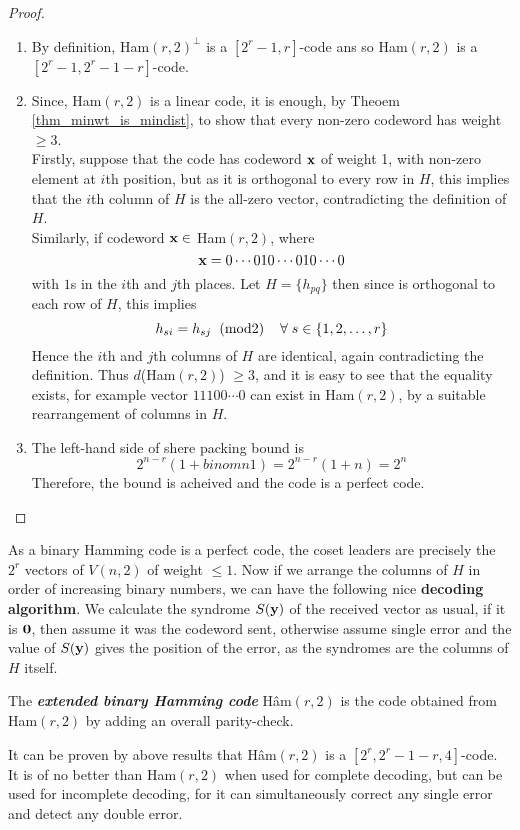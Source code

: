 \documentclass[../main.tex]{subfiles}
\begin{document}
\begin{proof}
	$\;$ 
	\begin{enumerate}[label=(\roman*)]
	\itemsep-1mm
		\item By definition, Ham$(r,2)^\perp$ is a $[2^r-1,r]$-code ans so Ham$(r,2	)$ is a $[2^r-1, 2^r-1-r]$-code.
		\item Since, Ham$(r,2)$ is a linear code, it is enough, by Theoem \ref{thm_minwt_is_mindist}, to show that every non-zero codeword has weight$\geq 3$.\\
		Firstly, suppose that the code has codeword $\textbf{x}$ of weight 1, with non-zero element at $i$th position, but as it is orthogonal to every row in $H$, this implies that the $i$th column of $H$ is the all-zero vector, contradicting the definition of $H$.\\
		Similarly, if codeword $\textbf{x} \in$ Ham$(r,2)$, where 
		\[
			\textbf{x} = 0\cdots 010\cdots 010\cdots 0
		\]
		with $1$s in the $i$th and $j$th places. Let $H = \{h_{pq}\}$ then since  is orthogonal to each row of $H$, this implies
		\[
			h_{si} = h_{sj} \hspace{2mm}(\text{mod} 2)\hspace{4mm} \forall\; s \in \{1,2,\ldots,r\}
		\]  
		 Hence the $i$th and $j$th columns of $H$ are identical, again contradicting the definition.
		 Thus $d$(Ham$(r,2)$) $\geq 3$, and it is easy to see that the equality exists, for example vector $11100\cdots 0$ can exist in Ham$(r,2)$, by a suitable rearrangement of columns in $H$.
		 \item The left-hand side of shere packing bound is
		 \[
		 	2^{n-r}\left(1 + binom{n}{1}\right) = 2^{n-r}(1+n) = 2^n
		 \]  
		 Therefore, the bound is acheived and the code is a perfect code.
	\end{enumerate}	
	
\end{proof}

As a binary Hamming code is a perfect code, the coset leaders are precisely the $2^r$ vectors of $V(n,2)$ of weight $\leq 1$. Now if we arrange the columns of $H$ in order of increasing binary numbers, we can have the following nice \textbf{decoding algorithm}. We calculate the syndrome $S(\textbf{y})$ of the received vector  as usual, if it is $\textbf{0}$, then assume it was the codeword sent, otherwise assume single error and the value of $S(\textbf{y})$ gives the position of the error, as the syndromes are the columns of $H$ itself.

\begin{defn}
	The \textbf{\emph{extended binary Hamming code}} H\^{a}m$(r,2)$ is the code obtained from Ham$(r,2)$ by adding an overall parity-check.
\end{defn}
It can be proven by above results that H\^{a}m$(r,2)$ is a $[2^r, 2^r-1-r,4]$-code. It is of no better than Ham$(r,2)$ when used for complete decoding, but can be used for incomplete decoding, for it can simultaneously correct any single error and detect any double error.\\
\end{document}
